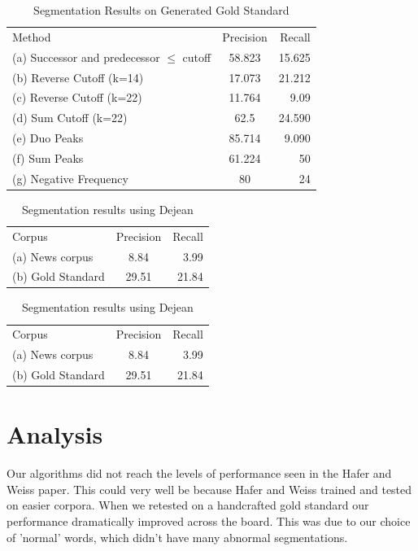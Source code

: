 \documentclass[11pt]{article}
\begin{document}
\begin{table}
\centering
\begin{tabular}{ l  c || r }
  Method & Precision & Recall \\
    (a) Successor and predecessor $\leq$ cutoff & 58.823 & 15.625\\
    (b) Reverse Cutoff (k=14) & 17.073 & 21.212\\
    (c) Reverse Cutoff (k=22) & 11.764 & 9.09 \\
    (d) Sum Cutoff (k=22) & 62.5 & 24.590 \\
    (e) Duo Peaks         & 85.714 & 9.090 \\
    (f) Sum Peaks         & 61.224 & 50 \\
    (g) Negative Frequency & 80 & 24 \\
\end{tabular}
\caption{Segmentation Results on Generated Gold Standard}
\label{tab:table2}
\end{table}

\begin{table}
\centering
\begin{tabular}{ l  c  r }
  Corpus & Precision & Recall \\
    (a) News corpus & 8.84 & 3.99 \\
    (b) Gold Standard & 29.51 & 21.84\\
\end{tabular}
\caption{Segmentation results using Dejean}
\label{tab:table3}
\end{table}

\begin{table}
\centering
\begin{tabular}{ l  c  r }
  Corpus & Precision & Recall \\
    (a) News corpus & 8.84 & 3.99 \\
    (b) Gold Standard & 29.51 & 21.84\\
\end{tabular}
\caption{Segmentation results using Dejean}
\label{tab:table3}
\end{table}


\section{Analysis}
Our algorithms did not reach the levels of performance seen in the Hafer and
Weiss paper. This could very well be because Hafer and Weiss trained and
tested on easier corpora. When we retested on a handcrafted gold standard
our performance dramatically improved across the board. This was due to our
choice of 'normal' words, which didn't have many abnormal segmentations.
\end{document}
